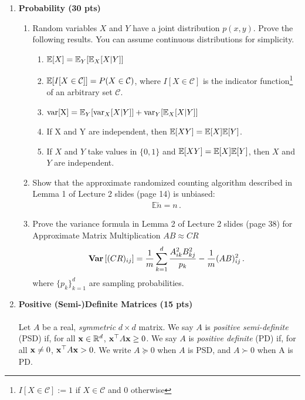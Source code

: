 \begin{enumerate}
    
    \item \textbf{Probability  (30 pts)}
    \begin{enumerate}
        \item Random variables $X$ and $Y$ have a joint distribution $p(x, y)$. Prove the following results. You can assume continuous distributions for simplicity.
        \begin{enumerate}
            \item $\mathbb{E}[X] = \mathbb{E}_Y[\mathbb{E}_X[X|Y]]$
            \item $\mathbb{E}[I[X \in \mathcal{C}]] = P(X \in \mathcal{C})$, where $I[X \in \mathcal{C}]$ is the indicator function\footnote{$I[X\in \mathcal{C}]:=1$ if $X\in \mathcal{C}$ and $0$ otherwise} of an arbitrary set $\mathcal{C}$.
            \item $\text{var[X]} = \mathbb{E}_Y[\text{var}_X[X|Y]] + \text{var}_Y[\mathbb{E}_X[X|Y]]$
            \item If X and Y are independent, then $\mathbb{E}[XY] = \mathbb{E}[X] \mathbb{E}[Y]$.
            \item If $X$ and $Y$ take values in $\{0,1\}$ and $\mathbb{E}[ XY ] = \mathbb{E}[X] \mathbb{E}[Y]$, then $X$ and $Y$ are independent.
        \end{enumerate}
        \item Show that the approximate randomized counting algorithm described in Lemma 1 of Lecture 2 slides (page 14) is unbiased:
        \begin{align}
            \mathbb{E} \tilde n = n\,.
        \end{align}
        \item Prove the variance formula in Lemma 2 of Lecture 2 slides (page 38) for Approximate Matrix Multiplication $AB\approx CR$
        \begin{align}
        {\bf Var}\left[ (CR)_{ij} \right] = \frac{1}{m} \sum_{k=1}^d \frac{A^2_{ik}B^2_{kj}}{p_k} - \frac{1}{m} (AB)^2_{ij}\,.
        \end{align}
        where $\{p_k\}_{k=1}^d$ are sampling probabilities.


    \end{enumerate}
    \solution{
    }
    
    \item \textbf{Positive (Semi-)Definite Matrices  (15 pts)}\\\\
    Let $A$ be a real, \emph{symmetric} $d \times d$ matrix. We say $A$ is \textit{positive semi-definite} (PSD) if, for all $\mathbf{x} \in \mathbb{R}^d$, $\mathbf{x}^{\top}A\mathbf{x} \geq 0$. We say $A$ is \textit{positive definite} (PD) if, for all $\mathbf{x} \neq 0$, $\mathbf{x}^{\top}A\mathbf{x} > 0$. We write $A \succeq 0$ when $A$ is PSD, and $A \succ 0$ when A is PD.


\end{enumerate}
